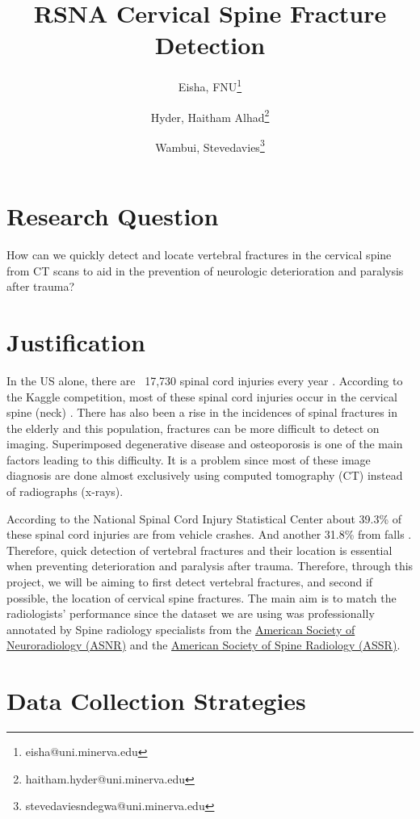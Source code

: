 \documentclass[11pt]{article}
\title{RSNA Cervical Spine Fracture Detection}
\author[1]{Eisha, FNU\thanks{eisha@uni.minerva.edu}}
\author[1]{Hyder, Haitham Alhad\thanks{haitham.hyder@uni.minerva.edu}}
\author[1]{Wambui, Stevedavies\thanks{stevedaviesndegwa@uni.minerva.edu}}
\affil[1]{
      \textbf{Haadavand's Minions}  \\
      \texttt{
        \href{mailto:hadavands-minions@uni.minerva.edu}
        {hadavands-minions@uni.minerva.edu}
      }
    }
\date{\vspace{-5ex}}
\begin{document}
\maketitle

\section*{Research Question}\label{research-question}

How can we quickly detect and locate vertebral fractures in the 
cervical spine from CT scans to aid in the prevention of 
neurologic deterioration and paralysis after trauma?

\section*{Justification}\label{justification}

In the US alone, there are ~17,730 spinal cord injuries every year \parencite{Morano2021-ak}.
According to the Kaggle competition, most of these spinal cord injuries occur
in the cervical spine (neck) \parencite{kaggle}.
There has also been a rise in the incidences of spinal fractures in the elderly
and this population, fractures can be more difficult to detect on imaging.
Superimposed degenerative disease and osteoporosis is one of the main factors
leading to this difficulty. It is a problem since most of these image
diagnosis are done almost exclusively using computed tomography (CT) \parencite{munera2012}
instead of radiographs (x-rays).

According to the National Spinal Cord Injury Statistical Center
about 39.3\% of these spinal cord injuries are from vehicle crashes.
And another 31.8\% from falls \parencite{NSCISC2019}.
Therefore, quick detection of vertebral fractures and their location is essential
when preventing deterioration and paralysis after trauma. Therefore, through
this project, we will be aiming to first detect vertebral fractures, and second
if possible, the location of cervical spine fractures. The main aim is
to match the radiologists' performance since the dataset we are using was professionally
annotated by Spine radiology specialists from the 
\href{https://www.asnr.org/}{American Society of Neuroradiology (ASNR)}
and the \href{https://www.theassr.org/}{American Society of Spine Radiology (ASSR)}.

\section*{Data Collection Strategies}\label{data-collection-strategies}
\end{document}
